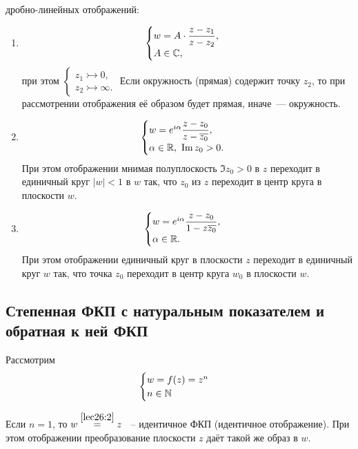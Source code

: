 \documentclass[../../main.tex]{subfiles}
\begin{document}
\begin{examples}
\begin{enumerate}
дробно-линейных отображений:
\begin{enumerate}
 \item 
 \[
  \begin{cases}
   w = A\cdot \dfrac{z - z_1}{z - z_2},\\
   A \in \mathbb{C},
  \end{cases}\]
при этом
$\begin{cases}
  z_1 \rightarrowtail 0,\\
  z_2 \rightarrowtail \infty.  
 \end{cases}
 $
Если окружность (прямая) содержит точку $z_2$, то при рассмотрении отображения
её образом будет прямая, иначе~--- окружность.
 \item
\[
\begin{cases}
 w = e^{i\alpha} \dfrac{z - z_0}{z- \overline{z_0}}, \\
 \alpha \in \mathbb{R},\  \operatorname{Im} z_0 > 0.
\end{cases}     
\]
При этом отображении мнимая полуплоскость $\Im z_0 > 0$ в \textcircled{$z$} 
переходит в единичный круг $|w| < 1$ в \textcircled{$w$} так,
что $z_0$ из \textcircled{$z$} переходит в центр круга в плоскости
\textcircled{$w$}.

 \item
\[
 \begin{cases}
  w = e^{i\alpha} \dfrac{z - z_0}{1 - z \overline{z_0}}, \\
  \alpha \in \mathbb{R}.
 \end{cases}
\]
При этом отображении единичный круг в плоскости \textcircled{$z$}
переходит в единичный круг \textcircled{$w$} так, что точка $z_0$ переходит
в центр круга  $w_0$ в плоскости \textcircled{$w$}.
\end{enumerate}

\end{enumerate}
\end{examples}

\subsection{Степенная ФКП с натуральным показателем и обратная к ней ФКП}
Рассмотрим
\begin{equation}
\label{lec26:2}
\begin{cases}
 w = f(z) = z^n \\
 n \in \mathbb{N}
\end{cases}
\end{equation}

Если $n = 1$, то $w \stackrel{\eqref{lec26:2}}{=} z$ ~-- 
идентичное ФКП (идентичное отображение).
При этом отображении преобразование плоскости \textcircled{$z$} 
даёт такой же образ в \textcircled{$w$}.
\end{document}
